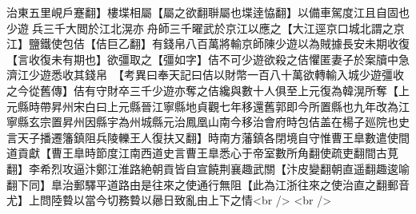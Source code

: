 治東五里峴戶蹇翻】樓堞相屬【屬之欲翻聨屬也堞逹恊翻】以備車駕度江且自固也少遊兵三千大閲於江北滉亦舟師三千曜武於京江以應之【大江逕京口城北謂之京江】鹽鐵使包佶【佶巨乙翻】有錢帛八百萬將輸京師陳少遊以為賊據長安未期收復【言收復未有期也】欲彊取之【彊如字】佶不可少遊欲殺之佶懼匿妻子於案牘中急濟江少遊悉收其錢帛　【考異曰奉天記曰佶以財幣一百八十萬欲轉輸入城少遊彊收之今從舊傳】佶有守財卒三千少遊亦奪之佶纔與數十人俱至上元復為韓滉所奪【上元縣時帶昇州宋白曰上元縣晉江寧縣地貞觀七年移還舊郭即今所置縣也九年改為江寧縣玄宗置昇州因縣宇為州城縣元治鳳凰山南今移治會府時包佶盖在楊子廵院也史言天子播遷籓鎮阻兵陵轢王人復扶又翻】時南方藩鎮各閉境自守惟曹王臯數遣使間道貢獻【曹王臯時節度江南西道史言曹王臯悉心于帝室數所角翻使疏吏翻間古莧翻】李希烈攻逼汴鄭江淮路絶朝貢皆自宣饒荆襄趣武關【汴皮變翻朝直遥翻趣逡喻翻下同】臯治郵驛平道路由是往來之使通行無阻【此為江浙往來之使治直之翻郵音尤】上問陸䞇以當今切務䞇以曏日致亂由上下之情<br />
<br />

